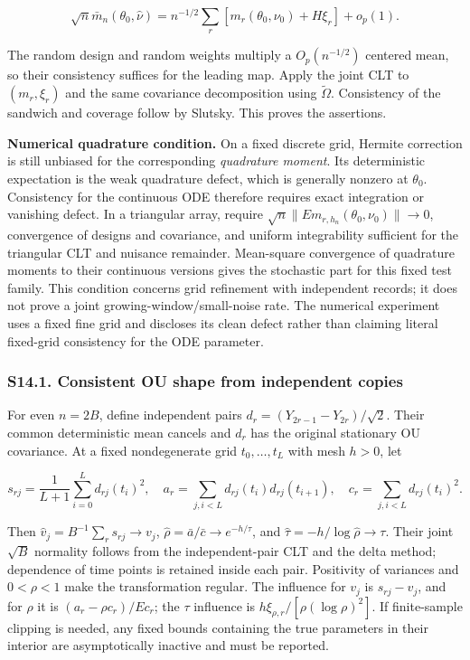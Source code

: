 \documentclass[
  11pt,
]{article}
\begin{document}
\[
\sqrt n\bar m_n(\theta_0,\widehat\nu)
=n^{-1/2}\sum_r[m_r(\theta_0,\nu_0)+H\xi_r]+o_p(1).
\]

The random design and random weights multiply a \(O_p(n^{-1/2})\)
centered mean, so their consistency suffices for the leading map. Apply
the joint CLT to \((m_r,\xi_r)\) and the same covariance decomposition
using \(\widetilde\Omega\). Consistency of the sandwich and coverage
follow by Slutsky. This proves the assertions.

\textbf{Numerical quadrature condition.} On a fixed discrete grid,
Hermite correction is still unbiased for the corresponding
\emph{quadrature moment}. Its deterministic expectation is the weak
quadrature defect, which is generally nonzero at \(\theta_0\).
Consistency for the continuous ODE therefore requires exact integration
or vanishing defect. In a triangular array, require
\(\sqrt n\|E m_{r,h_n}(\theta_0,\nu_0)\|\to0\), convergence of designs
and covariance, and uniform integrability sufficient for the triangular
CLT and nuisance remainder. Mean-square convergence of quadrature
moments to their continuous versions gives the stochastic part for this
fixed test family. This condition concerns grid refinement with
independent records; it does not prove a joint
growing-window/small-noise rate. The numerical experiment uses a fixed
fine grid and discloses its clean defect rather than claiming literal
fixed-grid consistency for the ODE parameter.

\subsubsection{S14.1. Consistent OU shape from independent
copies}\label{s14.1.-consistent-ou-shape-from-independent-copies}

For even \(n=2B\), define independent pairs
\(d_r=(Y_{2r-1}-Y_{2r})/\sqrt2\). Their common deterministic mean
cancels and \(d_r\) has the original stationary OU covariance. At a
fixed nondegenerate grid \(t_0,\ldots,t_L\) with mesh \(h>0\), let

\[
s_{rj}=\frac1{L+1}\sum_{i=0}^L d_{rj}(t_i)^2,
\quad a_r=\sum_{j,i<L}d_{rj}(t_i)d_{rj}(t_{i+1}),
\quad c_r=\sum_{j,i<L}d_{rj}(t_i)^2.
\]

Then \(\widehat v_j=B^{-1}\sum_r s_{rj}\to v_j\),
\(\widehat\rho=\bar a/\bar c\to e^{-h/\tau}\), and
\(\widehat\tau=-h/\log\widehat\rho\to\tau\). Their joint \(\sqrt B\)
normality follows from the independent-pair CLT and the delta method;
dependence of time points is retained inside each pair. Positivity of
variances and \(0<\rho<1\) make the transformation regular. The
influence for \(v_j\) is \(s_{rj}-v_j\), and for \(\rho\) it is
\((a_r-\rho c_r)/E c_r\); the \(\tau\) influence is
\(h\xi_{\rho,r}/[\rho(\log\rho)^2]\). If finite-sample clipping is
needed, any fixed bounds containing the true parameters in their
interior are asymptotically inactive and must be reported.
\end{document}
